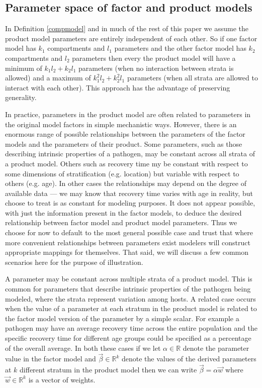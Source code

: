 \documentclass{article}
\theoremstyle{definition}
\newcommand{\R}{\mathbb{R}}%
\newcommand{\betavec}{\vec{\beta}}
\begin{document}
\subsection{Parameter space of factor and product models}
In Definition \ref{compmodel} and in much of the rest of this paper we assume the product model parameters are entirely independent of each other. So if one factor model has $k_1$ compartments and $l_1$ parameters and the other factor model has $k_2$ compartments and $l_2$ parameters then every the product model will have a minimum of $k_1l_2+k_2l_1$ parameters (when no interaction between strata is allowed) and a maximum of $k_1^2l_2+k_2^2l_1$ parameters (when all strata are allowed to interact with each other).  This approach has the advantage of preserving generality. 

In practice, parameters in the product model are often  related to parameters in the original model factors in simple mechanistic ways. 
However, there is an enormous range of possible relationships between the parameters of the factor models and the parameters of their product.
Some parameters, such as those describing intrinsic properties of a pathogen, may be constant across all strata of a product model. Others such as recovery time my be constant with respect to some dimensions of stratification (e.g. location) but variable with respect to others (e.g. age). In other cases the relationships may depend on the degree of available data --- we may know that recovery time varies with age in reality, but choose to treat is as constant for modeling purposes. It does not appear possible, with just the information present in the factor models, to deduce the desired relationship between factor model and product model parameters. Thus we choose for now to default to the most general possible case and trust that where more convenient relationships between parameters exist modelers will construct appropriate mappings for themselves. That said, we will discuss a few common scenarios here for the purpose of illustration. 

A parameter may be constant across multiple strata of a product model. This is common for parameters that describe intrinsic properties of the pathogen being modeled, where the strata represent variation among hosts. A related case occurs when the value of a parameter at each stratum in the product model is related to the factor model version of the parameter by a simple scalar. For example a pathogen may have an average recovery time across the entire population and the specific recovery time for different age groups could be specified as a percentage of the overall average. In both these cases if we let $\alpha\in\R$ denote the parameter value in the factor model and $\betavec\in\R^k$ denote the values of the derived parameters at $k$ different stratum in the product model then we can write $\betavec = \alpha\vec{w}$ where $\vec{w}\in\R^k$ is a vector of weights.
\end{document}
